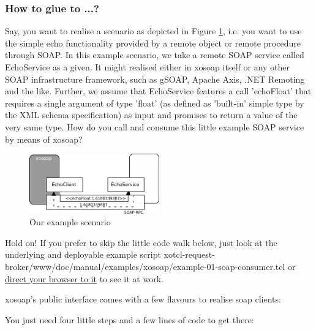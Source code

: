   \subsubsection{How to glue to ...?}
  Say, you want to realise a scenario as depicted in Figure \ref{fig:quickstart:xosoap:1}, i.e. you want to use the simple echo functionality provided by a remote object or remote procedure through SOAP. In this example scenario, we take a remote SOAP service called EchoService as a given. It might realised either in xosoap itself or any other SOAP infrastructure framework, such as gSOAP, Apache Axis, .NET Remoting and the like. Further, we assume that  EchoService features a call 'echoFloat' that requires a single argument of type 'float' (as defined as 'built-in' simple type by the XML schema specification) as input and promises to return a value of the very same type. How do you call and consume this little example SOAP service by means of xosoap?
\begin{figure}[htbp]
\begin{center}
\includegraphics[width=0.5\textwidth]{img/consumer.png}
\caption{Our example scenario}
\label{fig:quickstart:xosoap:1}
\end{center}
\end{figure}
\begin{hints}
\item Hold on! If you prefer to skip the little code walk below, just look at the underlying and deployable example script xotcl-request-broker/www/doc/manual/examples/xosoap/example-01-soap-consumer.tcl or \href{http://openacs-dotlrn.wu-wien.ac.at/request-broker/doc/manual/examples/xosoap/example-01-soap-consumer.tcl}{direct your browser to it} to see it at work.
\item xosoap's public interface comes with a few flavours to realise soap clients: 
\end{hints}
You just need four little steps and a few lines of code to get there:
